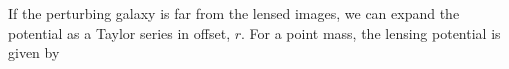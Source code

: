 If the perturbing galaxy is far from the lensed images, we can expand the potential as a Taylor series in offset, $r$. For a point mass, the lensing potential is given by
  